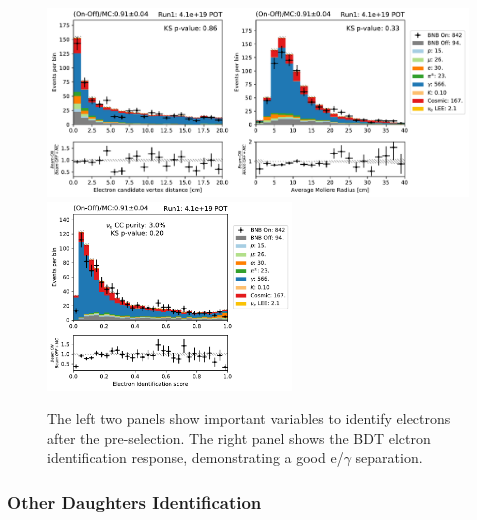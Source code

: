 \begin{figure}
    \centering
    \includegraphics[height=5cm]{NueCCsel/Images/run1/e_cand_dist.pdf}
    \includegraphics[height=5cm]{NueCCsel/Images/run1/pre_e_score.pdf}
    \caption{The left two panels show important variables to identify electrons after the pre-selection. The right panel shows the BDT elctron identification response, demonstrating a good e/$\gamma$ separation.}
    \label{fig:e_cand_dist}
\end{figure}



\subsubsection{Other Daughters Identification}


